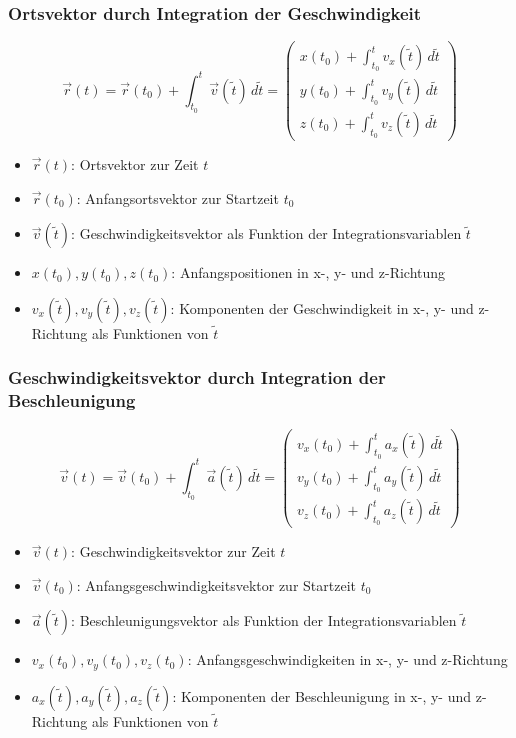 \documentclass[a4paper, 8pt]{extarticle}
\begin{document}
\begin{landscape}
\begin{multicols*}{3}
\subsubsection{Ortsvektor durch Integration der Geschwindigkeit}
\[
\vec{r}(t) = \vec{r}(t_0) + \int_{t_0}^{t} \vec{v}(\tilde{t}) \, d\tilde{t} = \begin{pmatrix} x(t_0) + \int_{t_0}^{t} v_x(\tilde{t}) \, d\tilde{t} \\ y(t_0) + \int_{t_0}^{t} v_y(\tilde{t}) \, d\tilde{t} \\ z(t_0) + \int_{t_0}^{t} v_z(\tilde{t}) \, d\tilde{t} \end{pmatrix}
\]
{\footnotesize
\begin{itemize}
    \item \( \vec{r}(t) \): Ortsvektor zur Zeit \( t \)
    \item \( \vec{r}(t_0) \): Anfangsortsvektor zur Startzeit \( t_0 \)
    \item \( \vec{v}(\tilde{t}) \): Geschwindigkeitsvektor als Funktion der Integrationsvariablen \( \tilde{t} \)
    \item \( x(t_0), y(t_0), z(t_0) \): Anfangspositionen in x-, y- und z-Richtung
    \item \( v_x(\tilde{t}), v_y(\tilde{t}), v_z(\tilde{t}) \): Komponenten der Geschwindigkeit in x-, y- und z-Richtung als Funktionen von \( \tilde{t} \)
\end{itemize}
}

\subsubsection{Geschwindigkeitsvektor durch Integration der Beschleunigung}
\[
\vec{v}(t) = \vec{v}(t_0) + \int_{t_0}^{t} \vec{a}(\tilde{t}) \, d\tilde{t} = \begin{pmatrix} v_x(t_0) + \int_{t_0}^{t} a_x(\tilde{t}) \, d\tilde{t} \\ v_y(t_0) + \int_{t_0}^{t} a_y(\tilde{t}) \, d\tilde{t} \\ v_z(t_0) + \int_{t_0}^{t} a_z(\tilde{t}) \, d\tilde{t} \end{pmatrix}
\]
{\footnotesize
\begin{itemize}
    \item \( \vec{v}(t) \): Geschwindigkeitsvektor zur Zeit \( t \)
    \item \( \vec{v}(t_0) \): Anfangsgeschwindigkeitsvektor zur Startzeit \( t_0 \)
    \item \( \vec{a}(\tilde{t}) \): Beschleunigungsvektor als Funktion der Integrationsvariablen \( \tilde{t} \)
    \item \( v_x(t_0), v_y(t_0), v_z(t_0) \): Anfangsgeschwindigkeiten in x-, y- und z-Richtung
    \item \( a_x(\tilde{t}), a_y(\tilde{t}), a_z(\tilde{t}) \): Komponenten der Beschleunigung in x-, y- und z-Richtung als Funktionen von \( \tilde{t} \)
\end{itemize}
}




\end{multicols*}
\end{landscape}
\end{document}
